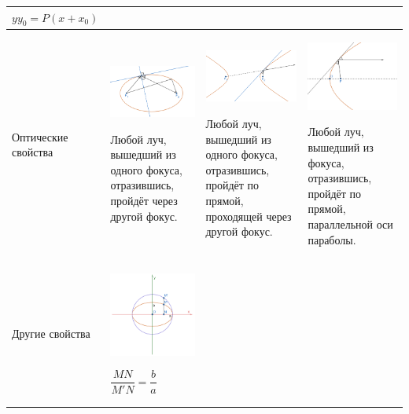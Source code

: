 \documentclass[twoside]{book}
\begin{document}
\begin{center}
\begin{longtable}{|p{2.5cm}|p{4.5cm}|p{4.5cm}|p{4.5cm}|}
        \(y y_0 = P(x + x_0)\)
        \\
        \hline
        Оптические свойства
         &
        \begin{center}
            \includegraphics[width=4.5cm]{Images/Chapter_1/3-1-16.png}
        \end{center}
        Любой луч, вышедший из одного фокуса, отразившись, пройдёт через другой фокус.
         &
        \begin{center}
            \includegraphics[width=4.5cm]{Images/Chapter_1/3-1-17.png}
        \end{center}
        Любой луч, вышедший из одного фокуса, отразившись, пройдёт по прямой, проходящей через другой фокус.
         &
        \begin{center}
            \includegraphics[width=4.5cm]{Images/Chapter_1/3-1-18.png}
        \end{center}
        Любой луч, вышедший из фокуса, отразившись, пройдёт по прямой, параллельной оси параболы.
        \\
        \hline
        Другие свойства
         &
        \begin{center}
            \includegraphics[width=4.5cm]{Images/Chapter_1/3-1-19.png}
        \end{center}
        \(\dfrac{MN}{M'N} = \dfrac{b}{a}\)


\end{longtable}
\end{center}
\end{document}
